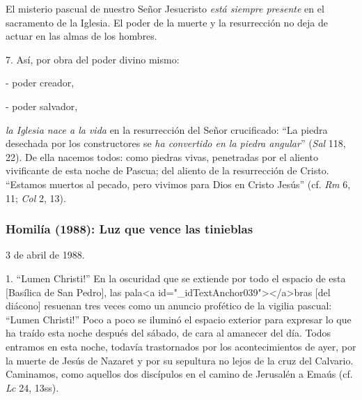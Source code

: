 			\begin{body}El misterio pascual de nuestro Señor Jesucristo \textit{está siempre presente }en el sacramento de la Iglesia. El poder de la muerte y la resurrección no deja de actuar en las almas de los hombres. \end{body}
			
			\begin{body}7. Así, por obra del poder divino mismo:\end{body}
			
			\begin{body}- poder creador, \end{body}
			
			\begin{body}- poder salvador, \end{body}
			
			\begin{body}\textit{la Iglesia nace a la vida} en la resurrección del Señor crucificado: “La piedra desechada por los constructores se \textit{ha convertido en la piedra angular}” (\textit{Sal} 118, 22). De ella nacemos todos: como piedras vivas, penetradas por el aliento vivificante de esta noche de Pascua; del aliento de la resurrección de Cristo. “Estamos muertos al pecado, pero vivimos para Dios en Cristo Jesús” (cf. \textit{Rm} 6, 11; \textit{Col} 2, 13).\end{body}
			
			\subsubsection{Homilía (1988): Luz que vence las tinieblas}
			
			\begin{referencia}3 de abril de 1988.\end{referencia}
			
			\begin{body} 1. “Lumen Christi!” En la oscuridad que se extiende por todo el espacio de esta [Basílica de San Pedro], las pala<a id="_idTextAnchor039"></a>bras [del diácono] resuenan tres veces como un anuncio profético de la vigilia pascual: “Lumen Christi!” Poco a poco se iluminó el espacio exterior para expresar lo que ha traído esta noche después del sábado, de cara al amanecer del día. Todos entramos en esta noche, todavía trastornados por los acontecimientos de ayer, por la muerte de Jesús de Nazaret y por su sepultura no lejos de la cruz del Calvario. Caminamos, como aquellos dos discípulos en el camino de Jerusalén a Emaús (cf. \textit{Lc} 24, 13ss). \end{body}
			
